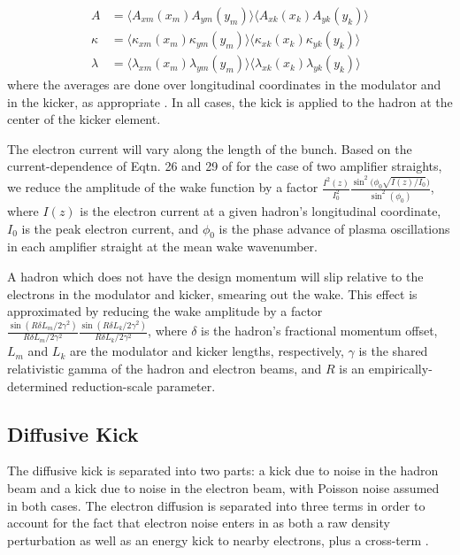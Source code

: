 \documentclass[letterpaper,11pt]{article}
\begin{document}
\begin{align}\label{eqtn:cec_wake_avg}
	A &= \langle A_{xm}(x_m) A_{ym}(y_m) \rangle \langle A_{xk}(x_k) A_{yk}(y_k)\rangle \\\nonumber
	\kappa &= \langle \kappa_{xm}(x_m) \kappa_{ym}(y_m)\rangle  \langle \kappa_{xk}(x_k) \kappa_{yk}(y_k)\rangle \\\nonumber
	\lambda &= \langle \lambda_{xm}(x_m) \lambda_{ym}(y_m)\rangle  \langle \lambda_{xk}(x_k) \lambda_{yk}(y_k)\rangle 
\end{align}
\noindent
where the averages are done over longitudinal coordinates in the modulator and in the kicker, as appropriate \cite{cite:napac2022}. In all cases, the kick is applied to the hadron at the center of the kicker element.

The electron current will vary along the length of the bunch. Based on the current-dependence of Eqtn. 26 and 29 of \cite{cite:stupakovamp} for the case of two amplifier straights, we reduce the amplitude of the wake function by a factor $\frac{I^2(z)}{I^2_0}\frac{\sin^2\big(\phi_0\sqrt{I(z)/I_0}\big)}{\sin^2(\phi_0)}$, where $I(z)$ is the electron current at a given hadron's longitudinal coordinate, $I_0$ is the peak electron current, and $\phi_0$ is the phase advance of plasma oscillations in each amplifier straight at the mean wake wavenumber.

A hadron which does not have the design momentum will slip relative to the electrons in the modulator and kicker, smearing out the wake. This effect is approximated by reducing the wake amplitude by a factor $\frac{\sin(R\delta L_m/2\gamma^2)}{R\delta L_m/2\gamma^2} \frac{\sin(R\delta L_k/2\gamma^2)}{R\delta L_k/2\gamma^2}$, where $\delta$ is the hadron's fractional momentum offset, $L_m$ and $L_k$ are the modulator and kicker lengths, respectively, $\gamma$ is the shared relativistic gamma of the hadron and electron beams, and $R$ is an empirically-determined reduction-scale parameter.

\subsection{Diffusive Kick}
The diffusive kick is separated into two parts: a kick due to noise in the hadron beam and a kick due to noise in the electron beam, with Poisson noise assumed in both cases. The electron diffusion is separated into three terms in order to account for the fact that electron noise enters in as both a raw density perturbation as well as an energy kick to nearby electrons, plus a cross-term \cite{cite:ipac2021} \cite{cite:e_noise_arxiv}.
\end{document}
